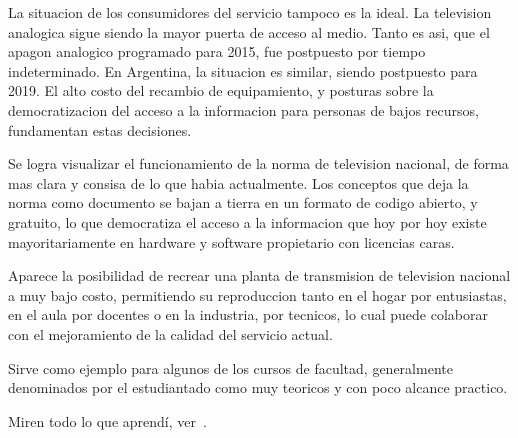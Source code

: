 La situacion de los consumidores del servicio tampoco es la ideal. La television analogica sigue siendo la mayor puerta de acceso al medio. Tanto es asi, que el apagon analogico programado para 2015, fue postpuesto por tiempo indeterminado. En Argentina, la situacion es similar, siendo postpuesto para 2019. El alto costo del recambio de equipamiento, y posturas sobre la democratizacion del acceso a la informacion para personas de bajos recursos, fundamentan estas decisiones.
	
Se logra visualizar el funcionamiento de la norma de television nacional, de forma mas clara y consisa de lo que habia actualmente. Los conceptos que deja la norma como documento se bajan a tierra en un formato de codigo abierto, y gratuito, lo que democratiza el acceso a la informacion que hoy por hoy existe mayoritariamente en hardware y software propietario con licencias caras.
	
Aparece la posibilidad de recrear una planta de transmision de television nacional a muy bajo costo, permitiendo su reproduccion tanto en el hogar por entusiastas, en el aula por docentes o en la industria, por tecnicos, lo cual puede colaborar con el mejoramiento de la calidad del servicio actual.
	
Sirve como ejemplo para algunos de los cursos de facultad, generalmente denominados por el estudiantado como muy teoricos y con poco alcance practico. 


Miren todo lo que aprendí, ver~\cite{Autor}.

